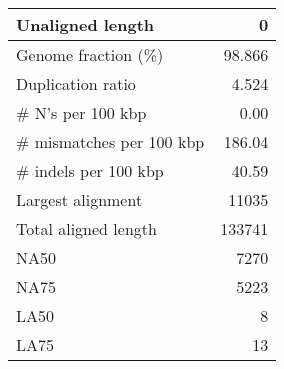 \documentclass[12pt,a4paper]{article}
\begin{document}
\begin{table}[ht]
\begin{center}
\begin{tabular}{|l*{1}{|r}|}
Unaligned length & 0 \\ \hline
Genome fraction (\%) & 98.866 \\ \hline
Duplication ratio & 4.524 \\ \hline
\# N's per 100 kbp & 0.00 \\ \hline
\# mismatches per 100 kbp & 186.04 \\ \hline
\# indels per 100 kbp & 40.59 \\ \hline
Largest alignment & 11035 \\ \hline
Total aligned length & 133741 \\ \hline
NA50 & 7270 \\ \hline
NA75 & 5223 \\ \hline
LA50 & 8 \\ \hline
LA75 & 13 \\ \hline
\end{tabular}
\end{center}
\end{table}
\end{document}
